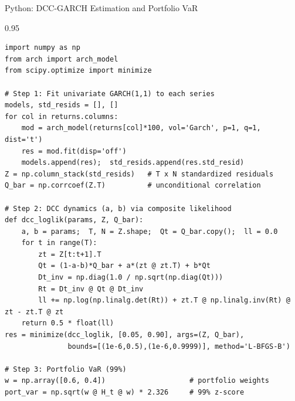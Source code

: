 \documentclass[9pt, aspectratio=169, t]{beamer}
\begin{document}

\begin{frame}[fragile]{Python: DCC-GARCH Estimation and Portfolio VaR}
    \begin{cminipage}{0.95\textwidth}
    \vspace{-2mm}
    {\tiny
\begin{verbatim}
import numpy as np
from arch import arch_model
from scipy.optimize import minimize

# Step 1: Fit univariate GARCH(1,1) to each series
models, std_resids = [], []
for col in returns.columns:
    mod = arch_model(returns[col]*100, vol='Garch', p=1, q=1, dist='t')
    res = mod.fit(disp='off')
    models.append(res);  std_resids.append(res.std_resid)
Z = np.column_stack(std_resids)   # T x N standardized residuals
Q_bar = np.corrcoef(Z.T)          # unconditional correlation

# Step 2: DCC dynamics (a, b) via composite likelihood
def dcc_loglik(params, Z, Q_bar):
    a, b = params;  T, N = Z.shape;  Qt = Q_bar.copy();  ll = 0.0
    for t in range(T):
        zt = Z[t:t+1].T
        Qt = (1-a-b)*Q_bar + a*(zt @ zt.T) + b*Qt
        Dt_inv = np.diag(1.0 / np.sqrt(np.diag(Qt)))
        Rt = Dt_inv @ Qt @ Dt_inv
        ll += np.log(np.linalg.det(Rt)) + zt.T @ np.linalg.inv(Rt) @ zt - zt.T @ zt
    return 0.5 * float(ll)
res = minimize(dcc_loglik, [0.05, 0.90], args=(Z, Q_bar),
               bounds=[(1e-6,0.5),(1e-6,0.9999)], method='L-BFGS-B')

# Step 3: Portfolio VaR (99%)
w = np.array([0.6, 0.4])                    # portfolio weights
port_var = np.sqrt(w @ H_t @ w) * 2.326     # 99% z-score
\end{verbatim}
    }
    \end{cminipage}
    \hfill{}
\end{frame}

\end{document}
